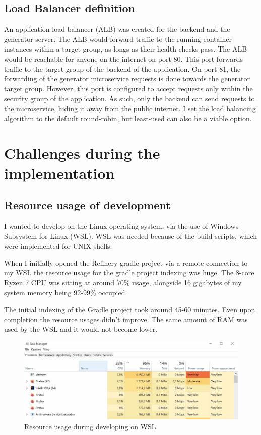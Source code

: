 		\subsection{Load Balancer definition} \label{awslb}
			An application load balancer (ALB) was created for the 
			backend and the generator server. The ALB would forward traffic to the running container instances within a target group, as longs as their
			health checks pass. 
			The ALB would be reachable for anyone on the internet on port 80. This port forwards traffic to the target group of the backend of the application.
			On port 81, the forwarding of the generator microservice requests is done towards the generator target group. However, this port is configured
			to accept requests only within the security group of the application. As such, only the backend can send requests to the microservice, hiding it 
			away from the public internet.
			I set the load balancing algorithm to the default round-robin, but least-used can also be a viable option.

	\section{Challenges during the implementation} \label{challenges}
	\subsection{Resource usage of development}
		I wanted to develop on the Linux operating system, via the use of Windows Subsystem for Linux (WSL). WSL was needed because 
		of the build scripts, which were implemented for UNIX shells.

		When I initially opened the Refinery gradle project via a remote connection to my WSL the resource usage 
		for the gradle project indexing was huge. The 8-core Ryzen 7 CPU was sitting at around 70\%  usage, alongside 
		16 gigabytes of my system memory being 92-99\% occupied. 
		
		The initial indexing of the Gradle project took around 45-60 minutes. Even upon completion the resource usages didn't improve. 
		The same amount of RAM
		was used by the WSL and it would not become lower. 

		\begin{figure}[h!]
			\begin{center}
				\includegraphics[scale=0.35]{include/imgs/res_usage.jpg}
				\caption{Resource usage during developing on WSL}
				\label{resourceusagewsl}
			\end{center}
		\end{figure}

